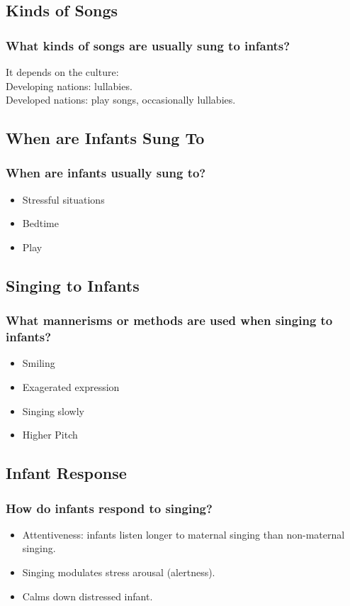 \documentclass{beamer}
\begin{document}
\subsection*{Kinds of Songs}
\begin{frame}
	\frametitle{What kinds of songs are usually sung to infants?}
	\pause
	It depends on the culture:\\
	\hfill\newline
	Developing nations: lullabies.\\
	Developed nations: play songs, occasionally lullabies.
\end{frame}

\subsection*{When are Infants Sung To}

\begin{frame}
	\frametitle{When are infants usually sung to?}
	\begin{itemize}
		\item Stressful situations
		\item Bedtime
		\item Play
	\end{itemize}
\end{frame}

\subsection*{Singing to Infants}

\begin{frame}
	\frametitle{What mannerisms or methods are used when singing to infants?}
	\begin{itemize}
		\item Smiling
		\item Exagerated expression
		\item Singing slowly
		\item Higher Pitch
	\end{itemize}
\end{frame}

\subsection*{Infant Response}
\begin{frame}
	\frametitle{How do infants respond to singing?}
	\begin{itemize}
		\item Attentiveness: infants listen longer to maternal singing than non-maternal singing.
		\item Singing modulates stress arousal (alertness).
		\pause
		\item Calms down distressed infant.
	\end{itemize}
\end{frame}
\end{document}
